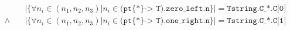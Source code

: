 \begin{definition}
\begin{enumerate}
            \begin{equation}
                \begin{split}
                                & |\{ \forall n_{i} \in \left(n_{1}, n_{2}, n_{3}\right) | n_{i} \in \texttt{(pt\{*\} -> T).zero\_left.n} \}| = \texttt{Tstring.C\_{*}.C[0]}\\
                    \wedge \quad & |\{ \forall n_{i} \in \left(n_{1}, n_{2}, n_{3}\right) | n_{i} \in \texttt{(pt\{*\} -> T).one\_right.n} \}| = \texttt{Tstring.C\_{*}.C[1]}
                \label{eq:numberof0and1givenbyruleC}
                \end{split}
            \end{equation}
        
    \label{enum:checkforvalidsol}
    \end{enumerate}

\label{def:checkforvalidsol}
\end{definition}
